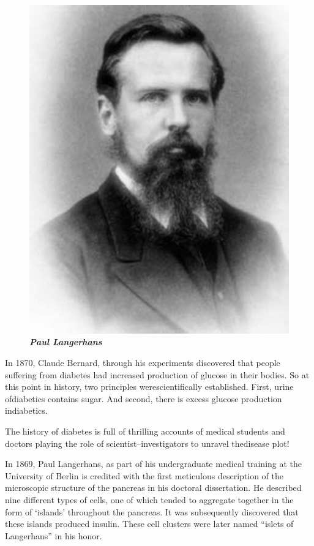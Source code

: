 \begin{figure}
\centering
\includegraphics[scale=.9]{images/008.jpg}\\
\textbf{\textit{Paul Langerhans}}
\end{figure}

In 1870, Claude Bernard, through his experiments discovered that people suffe\-ring from diabetes had increased produ\-ction of glucose in their bodies. So at this point in history, two principles were\break scientifically established. First, urine of\break diabetics contains sugar. And second, there is excess glucose production in\break diabetics.

The history of diabetes is full of thrilling accounts of medical students and doctors playing the role of scientist–investigators to unravel the\break disease plot!

In 1869, Paul Langerhans, as part of his undergraduate medical\- training at the University of Berlin is credited with the first meticulous description of the microscopic structure of the pancreas in his doctoral dissertation. He described nine different types of cells, one of which tended to aggregate together in the form of ‘islands’ throughout the pancreas. It was subsequently discovered that these islands produced insulin. These cell clusters were later named “islets of Langerhans” in his honor.

